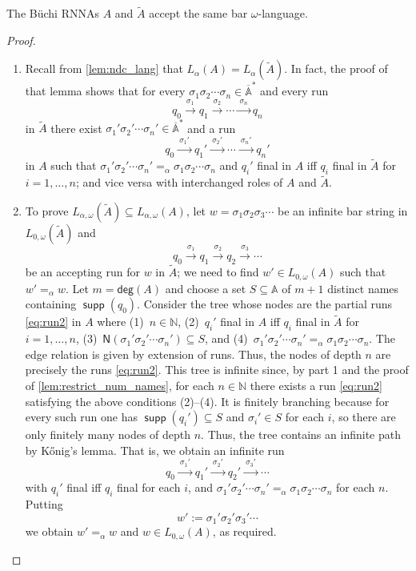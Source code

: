 \documentclass[final,a4paper,UKenglish,thm-restate,autoref,numberwithinsect]{lipics-v2021}
\newcommand{\Names}[1]{\mathsf{N}(#1)}
\newcommand{\degree}{\mathsf{deg}}
\newcommand{\barA}{\overline{\names}}
\numberwithin{equation}{section}
\newcommand{\xto}[1]{\xrightarrow{~#1~}}
\newcommand{\seq}{\subseteq}
\newcommand{\tl}{\widetilde}
\newcommand{\Nat}{{\mathbb{N}}}
\newcommand{\+}[1]{\mathcal{#1}\xspace}
\newcommand{\names}{\mathbb{A}}
\DeclareMathOperator{\supp}{\mathsf{supp}} %
\theoremstyle{definition}
\begin{document}
%
\begin{lemma}\label{lem:alpha_lang_buechi}
  The Büchi RNNAs $A$ and $\tl A$ accept the same bar
  $\omega$-language.%
\end{lemma}
%
\begin{proof}
  \begin{enumerate}
  \item Recall from \autoref{lem:ndc_lang} that
    $L_\alpha(A)=L_\alpha(\tl{A})$. In fact, the proof of that lemma
    shows that for every $\sigma_1\sigma_2\cdots \sigma_n\in \barA^*$
    and every run
    \[
      q_0\xto{\sigma_1} q_1\xto{\sigma_2} \cdots \xto{\sigma_n} q_n
    \]
    in $\tl{A}$ there exist $\sigma_1'\sigma_2'\cdots \sigma_n'\in \barA^*$ and a run
    \begin{equation}\label{eq:run2}
      q_0\xto{\sigma_1'} q_1'\xto{\sigma_2'} \cdots \xto{\sigma_n'}
      q_n'
    \end{equation}
    in ${A}$ such that
    $\sigma_1'\sigma_2'\cdots \sigma_n'=_\alpha \sigma_1\sigma_2\cdots
    \sigma_n$ and $q_i'$ final in $A$ iff $q_i$ final in $\tl{A}$ for
    $i=1,\ldots, n$; and vice versa with interchanged roles of $A$ and
    $\tl{A}$.
    
  \item To prove $L_{\alpha,\omega}(\tl{A})\seq L_{\alpha,\omega}(A)$,
    let $w=\sigma_1\sigma_2\sigma_3\cdots$ be an infinite bar string
    in $L_{0,\omega}(\tl{A})$ and %
    \[
      q_0\xto{\sigma_1} q_1\xto{\sigma_2} q_2 \xto{\sigma_3}\cdots
    \]
    be an accepting run for $w$ in $\tl{A}$; we need to find $w'\in
    L_{0,\omega}(A)$ such that $w'=_\alpha w$. Let
    $m=\degree(A)$ and choose a set $S\seq \names$ of
    $m+1$ distinct names containing
    $\supp(q_0)$. Consider the tree whose nodes are the partial runs
    \eqref{eq:run2} in $A$ where (1)~$n\in \Nat$,
    (2)~$q_i'$ final in $A$ iff
    $q_i$ final in $\tl{A}$ for $i=1,\ldots, n$, (3)~$\Names{\sigma_1'\sigma_2'\cdots \sigma_n'}\seq S$, and (4)~$\sigma_1'\sigma_2'\cdots \sigma_n'=_\alpha
    \sigma_1\sigma_2\cdots
    \sigma_n$. The edge relation is given by extension of runs. Thus,
    the nodes of depth
    $n$ are precisely the runs \eqref{eq:run2}. This tree is infinite
    since, by part 1 and the proof of \autoref{lem:restrict_num_names},
    for each $n\in
    \Nat$ there exists a run \eqref{eq:run2} satisfying the above
    conditions \mbox{(2)--(4)}. It is finitely branching because for
    every such run one has $\supp(q_i')\seq S$ and $\sigma_i'\in
    S$ for each
    $i$, so there are only finitely many nodes of depth
    $n$. Thus, the tree contains an infinite path by K\H{o}nig's
    lemma. That is, we obtain an infinite run
    \[
      q_0\xto{\sigma_1'} q_1'\xto{\sigma_2'} q_2'\xto{\sigma_3'}\cdots
    \]
    with $q_i'$ final iff $q_i$ final for each $i$, and
    $\sigma_1'\sigma_2'\cdots \sigma_n'=_\alpha \sigma_1\sigma_2\cdots
    \sigma_n$ for each $n$. Putting
    \[
      w':= \sigma_1'\sigma_2'\sigma_3'\cdots
    \]
    we obtain $w'=_\alpha w$ and $w\in L_{0,\omega}(A)$, as required.
    

\end{enumerate}
\end{proof}
\end{document}
